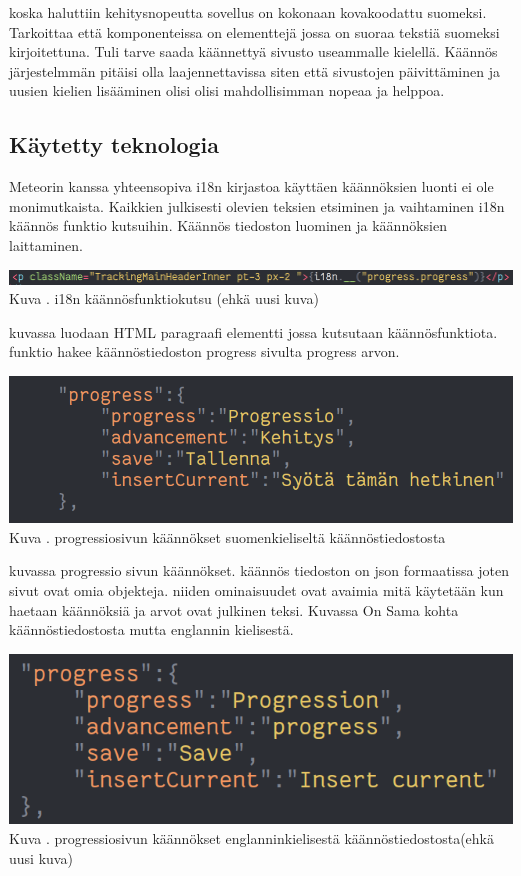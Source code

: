 \documentclass[11pt,a4paper,titlepage,oneside]{article}
\begin{document}
koska haluttiin kehitysnopeutta sovellus on kokonaan kovakoodattu suomeksi.
Tarkoittaa että komponenteissa on elementtejä jossa on suoraa tekstiä suomeksi kirjoitettuna.
Tuli tarve saada käännettyä sivusto useammalle kielellä.
Käännös järjestelmmän pitäisi olla laajennettavissa siten että sivustojen päivittäminen ja uusien kielien lisääminen olisi 
olisi mahdollisimman nopeaa ja helppoa.



\medskip


\subsection{Käytetty teknologia}
Meteorin kanssa yhteensopiva i18n kirjastoa käyttäen käännöksien luonti ei ole monimutkaista.
Kaikkien julkisesti olevien teksien etsiminen ja vaihtaminen i18n käännös funktio kutsuihin.
Käännös tiedoston luominen ja käännöksien laittaminen.
\bigskip

\includegraphics[width = 15cm]{src/public/oppar/translationcall.png}\\
Kuva \getImgCount. {} i18n käännösfunktiokutsu (ehkä uusi kuva)
\medskip

kuvassa luodaan HTML paragraafi elementti jossa kutsutaan käännösfunktiota. funktio hakee käännöstiedoston progress sivulta progress arvon.
\bigskip

\includegraphics[width = 15cm]{src/public/oppar/translationfile.png}\\
Kuva \getImgCount. {} progressiosivun käännökset suomenkieliseltä käännöstiedostosta
\medskip

kuvassa progressio sivun käännökset. käännös tiedoston on json formaatissa joten sivut ovat omia objekteja. 
niiden ominaisuudet ovat avaimia mitä käytetään kun haetaan käännöksiä ja arvot ovat julkinen teksi.
Kuvassa \nextImageCount {} On Sama kohta käännöstiedostosta mutta englannin kielisestä.
\bigskip


\includegraphics[width = 15cm]{src/public/oppar/translationfileEng.png}\\
Kuva \getImgCount {}. progressiosivun käännökset englanninkielisestä käännöstiedostosta(ehkä uusi kuva)
\medskip
\end{document}
